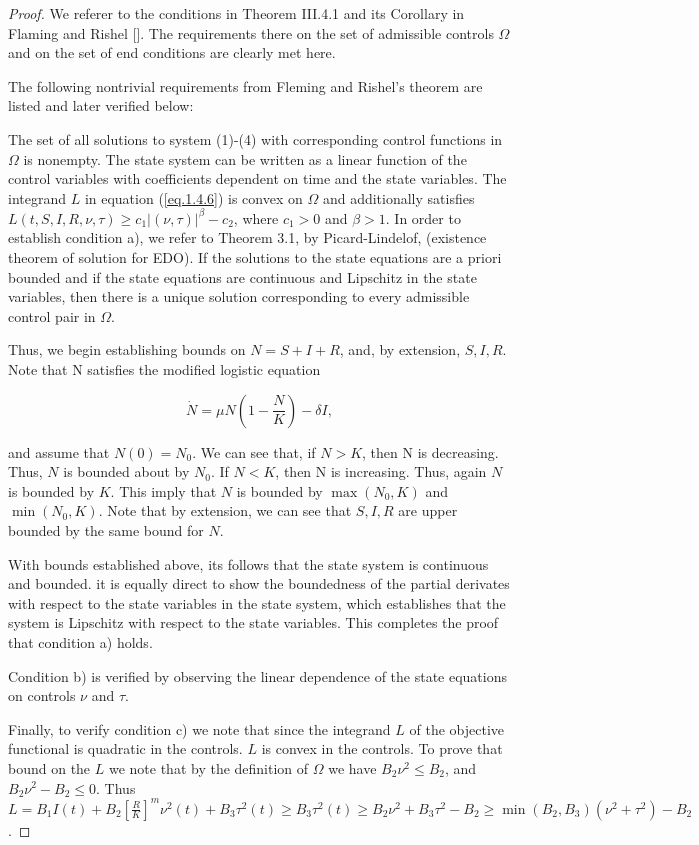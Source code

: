 \begin{proof}
We referer to the conditions in Theorem III.4.1 and its Corollary in Flaming and Rishel []. The requirements there on the set of admissible controls $\Omega$ and on the set of end conditions are clearly met here.

The following nontrivial requirements from Fleming and Rishel’s theorem are listed and later verified below:

The set of all solutions to system (1)-(4) with corresponding control functions in $\Omega$ is nonempty.
The state system can be written as a linear function of the control variables with coefficients dependent on time and the state variables.
The integrand $L$ in equation (\ref{eq.1.4.6}) is convex on $\Omega$ and additionally satisfies $L(t,S,I,R,\nu,\tau) \geq c_1 |(\nu,\tau)|^{\beta}-c_2$, where $c_1>0$ and $\beta>1$.
In order to establish condition a), we refer to Theorem 3.1, by Picard-Lindelof, (existence theorem of solution for EDO). If the solutions to the state equations are a priori bounded and if the state equations are continuous and Lipschitz in the state variables, then there is a unique solution corresponding to every admissible control pair in $\Omega$.

Thus, we begin establishing bounds on $N=S+I+R$, and, by extension, $S,I,R$. Note that N satisfies the modified logistic equation

\begin{equation}\label{eq.1.4.8}
\dot{N}=\mu N(1-\frac{N}{K})-\delta I,
\end{equation}

and assume that $N(0)=N_0$. We can see that, if $N>K$, then N is decreasing. Thus, $N$ is bounded about by $N_0$. If $N<K$, then N is increasing. Thus, again $N$ is bounded by $K$. This imply that $N$ is bounded by $\max (N_0,K)$ and $\min (N_0,K)$. Note that by extension, we can see that $S,I,R$ are upper bounded by the same bound for $N$.

With bounds established above, its follows that the state system is continuous and bounded. it is equally direct to show the boundedness of the partial derivates with respect to the state variables in the state system, which establishes that the system is Lipschitz with respect to the state variables. This completes the proof that condition a) holds.

Condition b) is verified by observing the linear dependence of the state equations on controls $\nu$ and  $\tau$.

Finally, to verify condition c) we note that since the integrand $L$ of the objective functional is quadratic in the controls. $L$ is convex in the controls. To prove that bound on the $L$ we note that by the definition of $\Omega$ we have $B_2 \nu^2\leq B_2$, and $B_2\nu^2-B_2\leq 0$. Thus $L=B_1 I(t)+B_2[\frac{R}{K}]^m \nu^2(t) +B_3\tau^2(t)\geq B_3\tau^2 (t)\geq B_2\nu^2+B_3\tau^2-B_2\geq \min (B_2,B_3)(\nu^2+\tau^2)-B_2$.
\end{proof}

